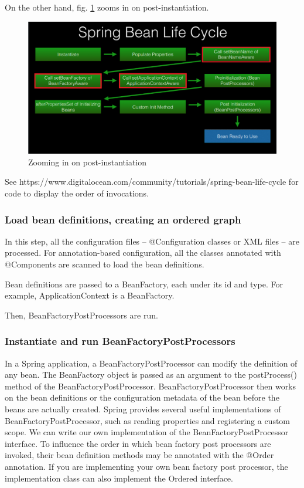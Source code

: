 \documentclass{scrartcl}
\begin{document}
On the other hand, fig. \ref{fig:bean-lifecycle-1} zooms in on post-instantiation.

\begin{figure}
    \centering
    \includegraphics[width=1\linewidth]{bean-lifecycle-1}
    \caption{Zooming in on post-instantiation}
    \label{fig:bean-lifecycle-1}
\end{figure}


See https://www.digitalocean.com/community/tutorials/spring-bean-life-cycle for code to display the order of invocations.

\subsubsection{Load bean definitions, creating an ordered graph}
In this step, all the configuration files – @Configuration classes or XML files – are processed. For annotation-based configuration, all the classes annotated with @Components are scanned to load the bean definitions.

Bean definitions are passed to a BeanFactory, each under its id and type. For example, ApplicationContext is a BeanFactory.

Then, BeanFactoryPostProcessors are run.

\subsubsection{Instantiate and run BeanFactoryPostProcessors}
In a Spring application, a BeanFactoryPostProcessor can modify the definition of any bean.
The BeanFactory object is passed as an argument to the postProcess() method of the BeanFactoryPostProcessor. BeanFactoryPostProcessor then works on the bean definitions or the configuration metadata of the bean before the beans are actually created.
Spring provides several useful implementations of BeanFactoryPostProcessor, such as reading properties and registering a custom scope. We can write our own implementation of the BeanFactoryPostProcessor interface. To influence the order in which bean factory post processors are invoked, their bean definition methods may be annotated with the @Order annotation. If you are implementing your own bean factory post processor, the implementation class can also implement the Ordered interface.
\end{document}

